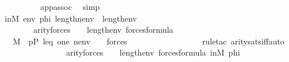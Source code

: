 \begin{isabellebody}
\ \ \ \ \ \ \ \ \isamarkupfalse%
\ app{\isacharunderscore}{\kern0pt}assoc\ \isamarkupfalse%
\ simp\isanewline
\ \ \ \ \ \ \isamarkupfalse%
\ \isanewline
\ \ \ \ \ \ \isamarkupfalse%
\ in{\isacharunderscore}{\kern0pt}M{\isacharprime}{\kern0pt}\ {\isacartoucheopen}env{\isasymin}{\isacharunderscore}{\kern0pt}{\isacartoucheclose}\ phi\ {\isacartoucheopen}length{\isacharparenleft}{\kern0pt}nenv{\isacharparenright}{\kern0pt}\ {\isacharequal}{\kern0pt}\ length{\isacharparenleft}{\kern0pt}env{\isacharparenright}{\kern0pt}{\isacartoucheclose}\isanewline
\ \ \ \ \ \ \ \ {\isacartoucheopen}arity{\isacharparenleft}{\kern0pt}forces{\isacharparenleft}{\kern0pt}{\isacharquery}{\kern0pt}{\isasymchi}{\isacharparenright}{\kern0pt}{\isacharparenright}{\kern0pt}\ {\isasymle}\ {}\ {\isacharhash}{\kern0pt}{\isacharplus}{\kern0pt}\ length{\isacharparenleft}{\kern0pt}env{\isacharparenright}{\kern0pt}{\isacartoucheclose}\ {\isacartoucheopen}forces{\isacharparenleft}{\kern0pt}{\isacharquery}{\kern0pt}{\isasymchi}{\isacharparenright}{\kern0pt}{\isasymin}formula{\isacartoucheclose}\isanewline
\ \ \ \ \ \ \isamarkupfalse%
\ {\isachardoublequoteopen}{\isachardot}{\kern0pt}{\isachardot}{\kern0pt}{\isachardot}{\kern0pt}\ {\isasymlongleftrightarrow}\ M{\isacharcomma}{\kern0pt}\ \ {\isacharbrackleft}{\kern0pt}p{\isacharcomma}{\kern0pt}P{\isacharcomma}{\kern0pt}\ leq{\isacharcomma}{\kern0pt}\ one{\isacharcomma}{\kern0pt}{\isasymtheta}{\isacharbrackright}{\kern0pt}{\isacharat}{\kern0pt}\ nenv\ {\isacharat}{\kern0pt}\ {\isacharbrackleft}{\kern0pt}{\isasympi}{\isacharbrackright}{\kern0pt}\ {\isasymTurnstile}\ forces{\isacharparenleft}{\kern0pt}{\isacharquery}{\kern0pt}{\isasymchi}{\isacharparenright}{\kern0pt}{\isachardoublequoteclose}\ \ \ \ \ \ \ \ \isanewline
\ \ \ \ \ \ \ \ \isamarkupfalse%
\ {\isacharparenleft}{\kern0pt}rule{\isacharunderscore}{\kern0pt}tac\ arity{\isacharunderscore}{\kern0pt}sats{\isacharunderscore}{\kern0pt}iff{\isacharcomma}{\kern0pt}auto{\isacharparenright}{\kern0pt}\isanewline
\ \ \ \ \ \ \isamarkupfalse%
\ \isanewline
\ \ \ \ \ \ \isamarkupfalse%
\ {\isacartoucheopen}arity{\isacharparenleft}{\kern0pt}forces{\isacharparenleft}{\kern0pt}{\isacharquery}{\kern0pt}{\isasymchi}{\isacharparenright}{\kern0pt}{\isacharparenright}{\kern0pt}\ {\isasymle}\ {}\ {\isacharhash}{\kern0pt}{\isacharplus}{\kern0pt}\ length{\isacharparenleft}{\kern0pt}env{\isacharparenright}{\kern0pt}{\isacartoucheclose}\ {\isacartoucheopen}forces{\isacharparenleft}{\kern0pt}{\isacharquery}{\kern0pt}{\isasymchi}{\isacharparenright}{\kern0pt}{\isasymin}formula{\isacartoucheclose}\ in{\isacharunderscore}{\kern0pt}M{\isacharprime}{\kern0pt}\ phi\ \isanewline

\end{isabellebody}
